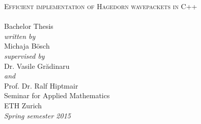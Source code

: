 \begin{titlepage}
\begin{center}
  \hfill
  \vspace{3.0cm}

  {\huge \textsc{Efficient implementation of Hagedorn wavepackets in C++\\[10pt]
  }}
  ~\\[20pt]

  {\huge{Bachelor Thesis}}\\[2.5cm]

  {\emph{written by}}\\
  Michaja Bösch
  \\[0.6cm]
  {\emph{supervised by}}\\
  Dr. Vasile Gr\u{a}dinaru\\
  {\emph{and}}\\
  Prof. Dr. Ralf Hiptmair
  \\[2.5cm]

  Seminar for Applied Mathematics\\
  ETH Zurich
  \\[0.5cm]
  \emph{{Spring semester 2015}}
\end{center}
\end{titlepage}